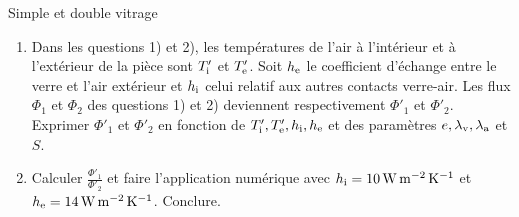 \begin{exo}[PC]{Simple et double vitrage}
\begin{quest}
\begin{enumerate}
\item Dans les questions 1) et 2), les températures de l'air à l'intérieur et à l'extérieur de la pièce sont $T_{\rm{i}}'$ et $T_{\rm{e}}'$. Soit $h_{\rm{e}}$ le coefficient d'échange entre le verre et l'air extérieur et $h_{\rm{i}}$ celui relatif aux autres contacts verre-air.
Les flux $\Phi_1$ et $\Phi_2$ des questions 1) et 2) deviennent respectivement $\Phi'_1$ et $\Phi'_2$. Exprimer $\Phi'_1$ et $\Phi'_2$ en fonction de $T_{\rm{i}}',T_{\rm{e}}',h_{\rm{i}},h_{\rm{e}}$ et des paramètres $e,\lambda_{\rm{v}},\lambda_{\rm{a}}$ et $S$.
\item Calculer $\frac{\Phi'_1}{\Phi'_2}$ et faire l'application numérique avec $h_{\rm{i}}=\SI{10}{W.m^{-2}.K^{-1}}$ et $h_{\rm{e}}=\SI{14}{W.m^{-2}.K^{-1}}$. Conclure.
\end{enumerate}
\end{quest}
\end{exo}


